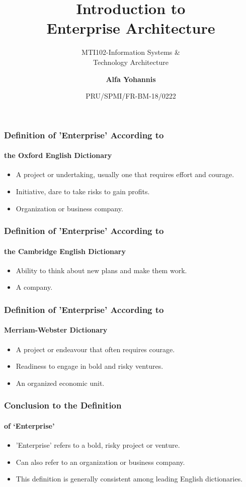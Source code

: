 \documentclass[aspectratio=169, table]{beamer}
\subtitle{MTI102-Information Systems \&\\Technology Architecture}
\title{\huge Introduction to\\Enterprise Architecture}
\date[Serial]{\scriptsize {PRU/SPMI/FR-BM-18/0222}}
\author[Pradita]{\small {\textbf{Alfa Yohannis}}}
\begin{document}
    \frame{\titlepage}

    \begin{frame}
        \frametitle{Definition of 'Enterprise' According to }
        \framesubtitle{the Oxford English Dictionary}
        \begin{itemize}
            \item A project or undertaking, usually one that requires effort and courage.
            \item Initiative, dare to take risks to gain profits.
            \item Organization or business company.
        \end{itemize}
    \end{frame}

    \begin{frame}
        \frametitle{Definition of 'Enterprise' According to}
        \framesubtitle{the Cambridge English Dictionary}
        \begin{itemize}
            \item Ability to think about new plans and make them work.
            \item A company.
        \end{itemize}
    \end{frame}

    \begin{frame}
        \frametitle{Definition of 'Enterprise' According to}
        \framesubtitle{Merriam-Webster Dictionary}
        \begin{itemize}
            \item A project or endeavour that often requires courage.
            \item Readiness to engage in bold and risky ventures.
            \item An organized economic unit.
        \end{itemize}
    \end{frame}

    \begin{frame}
        \frametitle{Conclusion to the Definition}
        \framesubtitle{of `Enterprise'}
        \begin{itemize}
            \item 'Enterprise' refers to a bold, risky project or venture.
            \item Can also refer to an organization or business company.
            \item This definition is generally consistent among leading English dictionaries.
        \end{itemize}
    \end{frame}
\end{document}
